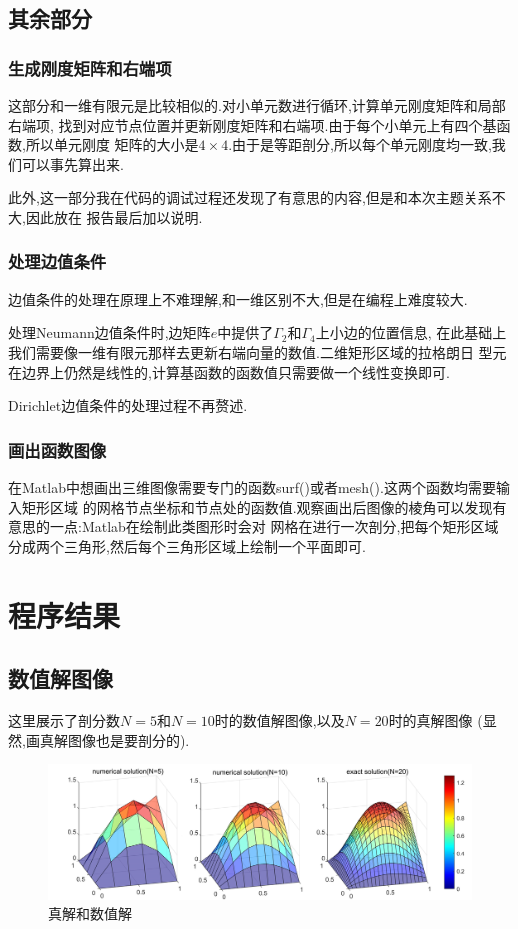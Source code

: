 \documentclass[11pt,reqno]{article}
\numberwithin{equation}{section}
\begin{document}
\subsection{其余部分}

\subsubsection{生成刚度矩阵和右端项}

这部分和一维有限元是比较相似的.对小单元数进行循环,计算单元刚度矩阵和局部右端项,
找到对应节点位置并更新刚度矩阵和右端项.由于每个小单元上有四个基函数,所以单元刚度
矩阵的大小是$4\times4.$由于是等距剖分,所以每个单元刚度均一致,我们可以事先算出来.

此外,这一部分我在代码的调试过程还发现了有意思的内容,但是和本次主题关系不大,因此放在
报告最后加以说明.

\subsubsection{处理边值条件}

边值条件的处理在原理上不难理解,和一维区别不大,但是在编程上难度较大.

处理Neumann边值条件时,边矩阵$e$中提供了$\Gamma_2$和$\Gamma_4$上小边的位置信息,
在此基础上我们需要像一维有限元那样去更新右端向量的数值.二维矩形区域的拉格朗日
型元在边界上仍然是线性的,计算基函数的函数值只需要做一个线性变换即可.

Dirichlet边值条件的处理过程不再赘述.

\subsubsection{画出函数图像}

在Matlab中想画出三维图像需要专门的函数surf()或者mesh().这两个函数均需要输入矩形区域
的网格节点坐标和节点处的函数值.观察画出后图像的棱角可以发现有意思的一点:Matlab在绘制此类图形时会对
网格在进行一次剖分,把每个矩形区域分成两个三角形,然后每个三角形区域上绘制一个平面即可.

\section{程序结果}
\subsection{数值解图像}
这里展示了剖分数$N=5$和$N=10$时的数值解图像,以及$N=20$时的真解图像
(显然,画真解图像也是要剖分的).
\begin{figure}[h]
	\centering
	  \includegraphics[width=\textwidth]{function.jpg}
	  \caption{真解和数值解}
\end{figure}
\end{document}
